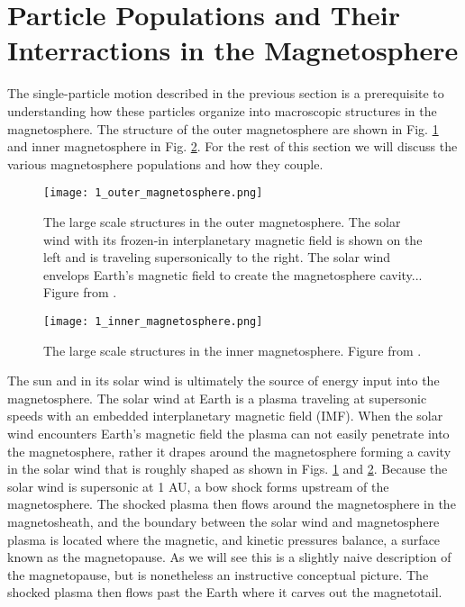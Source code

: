 \section{Particle Populations and Their Interractions in the Magnetosphere}\label{ntro:particle_populations}
The single-particle motion described in the previous section is a prerequisite to understanding how these particles organize into macroscopic structures in the magnetosphere. The structure of the outer magnetosphere are shown in Fig. \ref{Intro:outer_magnetosphere} and inner magnetosphere in Fig. \ref{Intro:inner_magnetosphere}. For the rest of this section we will discuss the various magnetosphere populations and how they couple.

\begin{figure}
\texttt{[image: 1\_outer\_magnetosphere.png]}
\caption{The large scale structures in the outer magnetosphere. The solar wind with its frozen-in interplanetary magnetic field is shown on the left and is traveling supersonically to the right. The solar wind envelops Earth's magnetic field to create the magnetosphere cavity... Figure from \citet{Baumjohann1997}.}
\label{Intro:outer_magnetosphere}
\end{figure}

\begin{figure}
\texttt{[image: 1\_inner\_magnetosphere.png]}
\caption{The large scale structures in the inner magnetosphere. Figure from \citet{Baumjohann1997}.}
\label{Intro:inner_magnetosphere}
\end{figure}

The sun and in its solar wind is ultimately the source of energy input into the magnetosphere. The solar wind at Earth is a plasma traveling at supersonic speeds with an embedded interplanetary magnetic field (IMF). When the solar wind encounters Earth's magnetic field the plasma can not easily penetrate into the magnetosphere, rather it drapes around the magnetosphere forming a cavity in the solar wind that is roughly shaped as shown in Figs. \ref{Intro:outer_magnetosphere} and \ref{Intro:inner_magnetosphere}. Because the solar wind is supersonic at 1 AU, a bow shock forms upstream of the magnetosphere. The shocked plasma then flows around the magnetosphere in the magnetosheath, and the boundary between the solar wind and magnetosphere plasma is located where the magnetic, and kinetic pressures balance, a surface known as the magnetopause. As we will see this is a slightly naive description of the magnetopause, but is nonetheless an instructive conceptual picture. The shocked plasma then flows past the Earth where it carves out the magnetotail.

